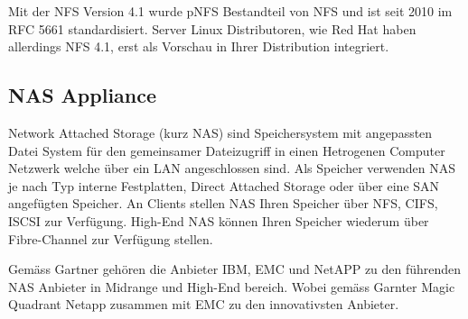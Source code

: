 Mit der NFS Version 4.1 wurde pNFS Bestandteil von NFS und ist seit 2010 im \gls{RFC} 5661 standardisiert. Server Linux Distributoren, wie Red Hat haben allerdings NFS 4.1, erst als Vorschau in Ihrer Distribution integriert.\cite{EastJacquelynnMichaelHidep-Smith2011}




\subsection{NAS Appliance}

Network Attached Storage (kurz NAS) sind Speichersystem mit angepassten Datei System für den gemeinsamer Dateizugriff in einen Hetrogenen Computer Netzwerk welche über ein LAN angeschlossen sind. Als Speicher verwenden NAS je nach Typ interne Festplatten, Direct Attached Storage oder über eine SAN angefügten Speicher.
An Clients stellen NAS Ihren Speicher über NFS, CIFS, ISCSI zur Verfügung. High-End NAS können Ihren Speicher wiederum über Fibre-Channel zur Verfügung stellen.

Gemäss Gartner gehören die Anbieter \gls{IBM,} \gls{EMC} und \gls{NetAPP} zu den führenden NAS Anbieter in Midrange und High-End bereich. Wobei gemäss Garnter Magic Quadrant Netapp zusammen mit EMC zu den innovativsten Anbieter.

